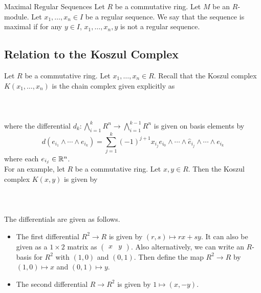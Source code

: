 \documentclass[a4paper]{article}
\begin{document}
\begin{defn}{Maximal Regular Sequences}{} Let $R$ be a commutative ring. Let $M$ be an $R$-module. Let $x_1,\dots,x_n\in I$ be a regular sequence. We say that the sequence is maximal if for any $y\in I$, $x_1,\dots,x_n,y$ is not a regular sequence. 
\end{defn}

\subsection{Relation to the Koszul Complex}
Let $R$ be a commutative ring. Let $x_1,\dots,x_n\in R$. Recall that the Koszul complex $K(x_1,\dots,x_n)$ is the chain complex given explicitly as \\~\\
\\~\\
where the differential $d_k:\bigwedge_{i=1}^kR^n\to\bigwedge_{i=1}^{k-1}R^n$ is given on basis elements by $$d(e_{i_1}\wedge\cdots\wedge e_{i_k})=\sum_{j=1}^k(-1)^{j+1}x_{i_j}e_{i_0}\wedge\cdots\wedge\hat{e}_{i_j}\wedge\cdots\wedge e_{i_k}$$ where each $e_{i_j}\in\mathbb{R}^n$. \\

For an example, let $R$ be a commutative ring. Let $x,y\in R$. Then the Koszul complex $K(x,y)$ is given by \\~\\
\\~\\
The differentials are given as follows. 
\begin{itemize}
\item The first differential $R^2\to R$ is given by $(r,s)\mapsto rx+sy$. It can also be given as a $1\times 2$ matrix as $\begin{pmatrix}x & y\end{pmatrix}$. Also alternatively, we can write an $R$-basis for $R^2$ with $(1,0)$ and $(0,1)$. Then define the map $R^2\to R$ by $(1,0)\mapsto x$ and $(0,1)\mapsto y$. 
\item The second differential $R\to R^2$ is given by $1\mapsto(x,-y)$. 
\end{itemize}
\end{document}
